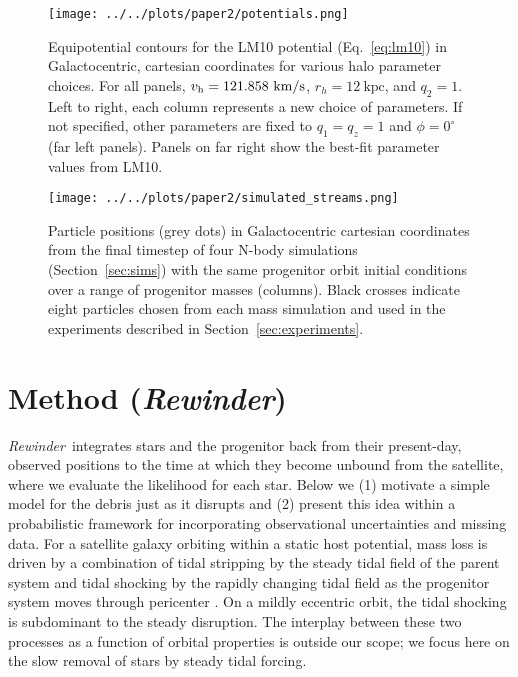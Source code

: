 \documentclass[letterpaper,12pt,preprint]{aastex}
\newcommand{\vhalo}{v_{\rm h}}
\newcommand{\rewinder}{\emph{Rewinder}}
\begin{document}
\begin{figure}[h]
\begin{center}
\texttt{[image: ../../plots/paper2/potentials.png]}
\caption{ Equipotential contours for the LM10 potential (Eq.~\ref{eq:lm10}) in Galactocentric, cartesian coordinates for various halo parameter choices. For all panels, $\vhalo=121.858~\mathrm{km}/\mathrm{s}$, $r_h=12~\mathrm{kpc}$, and $q_2=1$. Left to right, each column represents a new choice of parameters. If not specified, other parameters are fixed to $q_1=q_z=1$ and $\phi=0^\circ$ (far left panels). Panels on far right show the best-fit parameter values from LM10. }\label{fig:potential}
\end{center}
\end{figure}

\begin{figure}[h]
\begin{center}
\texttt{[image: ../../plots/paper2/simulated\_streams.png]}
\caption{ Particle positions (grey dots) in Galactocentric cartesian coordinates from the final timestep of four N-body simulations (Section~\ref{sec:sims}) with the same progenitor orbit initial conditions over a range of progenitor masses (columns). Black crosses indicate eight particles chosen from each mass simulation and used in the experiments described in Section~\ref{sec:experiments}.}\label{fig:sims}
\end{center}
\end{figure}

\section{Method (\rewinder)}\label{sec:method}

\rewinder\ integrates stars and the progenitor back from their present-day, observed positions to the time at which they become unbound from the satellite, where we evaluate the likelihood for each star. Below we (1) motivate a simple model for the debris just as it disrupts and (2) present this idea within a probabilistic framework for incorporating observational uncertainties and missing data. For a satellite galaxy orbiting within a static host potential, mass loss is driven by a combination of tidal stripping by the steady tidal field of the parent system and tidal shocking by the rapidly changing tidal field as the progenitor system moves through pericenter \citep[e.g.,][]{choi09}. On a mildly eccentric orbit, the tidal shocking is subdominant to the steady disruption. The interplay between these two processes as a function of orbital properties is outside our scope; we focus here on the slow removal of stars by steady tidal forcing. 
\end{document}
